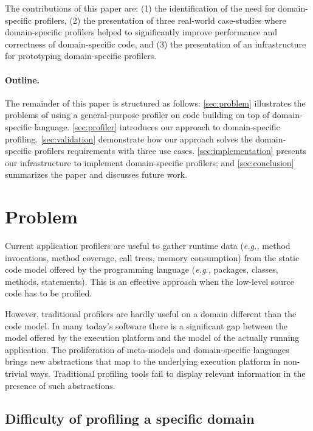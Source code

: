 \documentclass[runningheads]{llncs}
\newcommand{\eg}{\emph{e.g.,}\xspace}
\newcommand{\seclabel}[1]{\label{sec:#1}}
\begin{document}
The contributions of this paper are: (1) the identification of the need for domain-specific profilers, (2) the presentation of three real-world case-studies where domain-specific profilers helped to significantly improve performance and correctness of domain-specific code, and (3) the presentation of an infrastructure for prototyping domain-specific profilers.

\paragraph{Outline.} 
The remainder of this paper is structured as follows: \autoref{sec:problem} illustrates the problems of using a general-purpose profiler on code building on top of domain-specific language. \autoref{sec:profiler} introduces our approach to domain-specific profiling.
\autoref{sec:validation} demonstrate how our approach solves the domain-specific profilers requirements with three use cases. \autoref{sec:implementation} presents our infrastructure to implement domain-specific profilers; and \autoref{sec:conclusion} summarizes the paper and discusses future work.

\section{Problem}\seclabel{problem}

Current application profilers are useful to gather runtime data (\eg method invocations, method coverage, call trees, memory consumption) from the static code model offered by the programming language (\eg packages, classes, methods, statements). This is an effective approach when the low-level source code has to be profiled.

However, traditional profilers are hardly useful on a domain different than the code model. In many today's software there is a significant gap between the model offered by the execution platform and the model of the actually running application. 
The proliferation of meta-models and domain-specific languages brings new abstractions that map to the underlying execution platform in non-trivial ways. Traditional profiling tools fail to display relevant information in the presence of such abstractions.


\subsection{Difficulty of profiling a specific domain} \label{mondrian}
\end{document}
